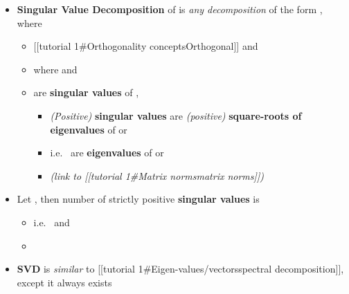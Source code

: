 \begin{itemize}

  \item
        \textbf{Singular Value Decomposition} of
         is \emph{any decomposition} of
        the form , where

        \begin{itemize}

          \item
                {[}{[}tutorial 1\#Orthogonality concepts\textbar Orthogonal{]}{]}
                and
          \item
                where  and
          \item
                 are \textbf{singular values}
                of ,

                \begin{itemize}

                  \item
                        \emph{(Positive)} \textbf{singular values} are \emph{(positive)}
                        \textbf{square-roots of eigenvalues} of  or
                  \item
                        i.e.~ are
                        \textbf{eigenvalues} of  or 
                  \item
                         \emph{(link to
                        {[}{[}tutorial 1\#Matrix norms\textbar matrix norms{]}{]})}
                \end{itemize}
        \end{itemize}
  \item
        Let , then number of strictly positive
        \textbf{singular values} is 

        \begin{itemize}

          \item
                i.e.~ and
          \item
        \end{itemize}
  \item
        \textbf{SVD} is \emph{similar} to {[}{[}tutorial
        1\#Eigen-values/vectors\textbar spectral decomposition{]}{]}, except
        it always exists


\end{itemize}
